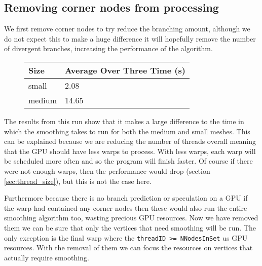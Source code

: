\subsection{Removing corner nodes from processing}
We first remove corner nodes to try reduce the branching amount, although we do not expect this to make a huge difference it will hopefully remove the number of divergent branches, increasing the performance of the algorithm. \\
\begin{figure}[H]\centering \begin{tabular}{ l | l }
  \hline
  Size & Average Over Three Time (s)\\
  \hline
  \hline
  small & 2.08 \\
  medium & 14.65 \\
  \hline
\end{tabular} \end{figure}

The results from this run show that it makes a large difference to the time in which the smoothing takes to run for both the medium and small meshes. This can be explained because we are reducing the number of threads overall meaning that the GPU should have less warps to process.  With less warps, each warp will be scheduled more often and so the program will finish faster. Of course if there were not enough warps, then the performance would drop (section \ref{sec:thread_size}), but this is not the case here.

Furthermore because there is no branch prediction or speculation on a GPU if the warp had contained any corner nodes then these would also run the entire smoothing algorithm too, wasting precious GPU resources. Now we have removed them we can be sure that only the vertices that need smoothing will be run.
The only exception is the final warp where the \verb!threadID >= NNodesInSet!
us GPU resources.
With the removal of them we can focus the resources on vertices that actually require smoothing.

